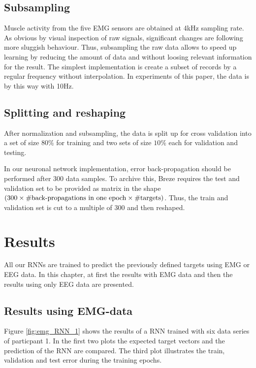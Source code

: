 \documentclass{article} %
\begin{document}
\subsection{Subsampling}
Muscle activity from the five EMG sensors are obtained at 4kHz sampling rate. As obvious by visual inspection of raw signals, significant changes are following more sluggish behaviour. Thus, subsampling the raw data allows to speed up learning by reducing the amount of data and without loosing relevant information for the result. The simplest implementation is create a subset of records by a regular frequency without interpolation. In experiments of this paper, the data is by this way with 10Hz.

\subsection{Splitting and reshaping}
After normalization and subsampling, the data is split up for cross validation into a set of size $80\%$ for training and two sets of size $10\%$ each for validation and testing.

In our neuronal network implementation, error back-propagation should be performed after 300 data samples.
To archive this, Breze requires the test and validation set to be provided as matrix in the shape $(300 \times \# \textnormal{back-propagations in one epoch} \times \# \textnormal{targets)}$.
Thus, the train and validation set is cut to a multiple of 300 and then reshaped.

\section{Results}
All our RNNs are trained to predict the previously defined targets using EMG or EEG data.
In this chapter, at first the results with EMG data and then the results using only EEG data are presented.
\subsection{Results using EMG-data}
Figure \ref{fig:emg_RNN_1} shows the results of a RNN trained with six data series of particpant 1.
In the first two plots the expected target vectors and the prediction of the RNN are compared.
The third plot illustrates the train, validation and test error during the training epochs.
\end{document}
